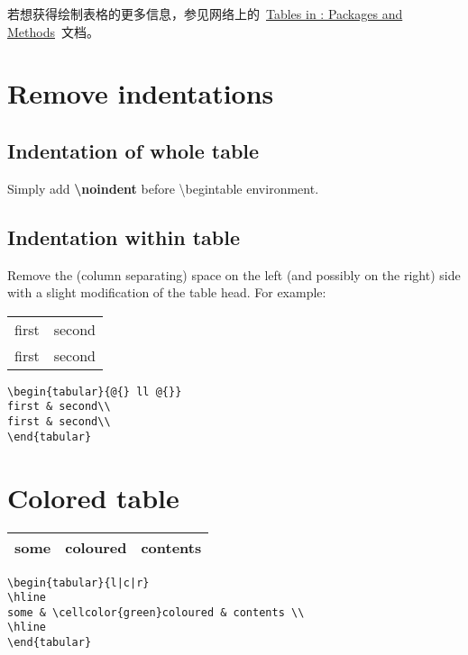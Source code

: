 若想获得绘制表格的更多信息，参见网络上的~\href{http://www.tug.org/pracjourn/2007-1/mori/}{Tables in \LaTeXe: Packages and Methods}~文档。

\section{Remove indentations}
\subsection{Indentation of whole table}
Simply add \textbf{\textbackslash noindent} before \textbackslash begin{table} environment.
\subsection{Indentation within table}
Remove the (column separating) space on the left (and possibly on the right) side with a slight modification of the table head. For example:

\begin{tabular}{@{} ll @{}}
	first & second\\
	first & second\\
\end{tabular}

\begin{lstlisting}[language={[LaTeX]TeX}]
\begin{tabular}{@{} ll @{}}
first & second\\
first & second\\
\end{tabular}
\end{lstlisting}

\section{Colored table}
\begin{tabular}{l|c|r}
\hline
some & \cellcolor{green}coloured & contents \\
\hline
\end{tabular}

\begin{lstlisting}[language={[LaTeX]TeX}]
\begin{tabular}{l|c|r}
\hline
some & \cellcolor{green}coloured & contents \\
\hline
\end{tabular}
\end{lstlisting}